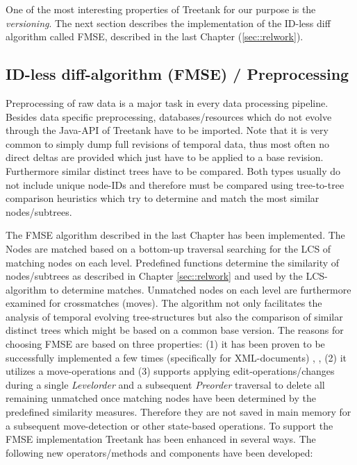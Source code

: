 One of the most interesting properties of Treetank for our purpose is the \emph{versioning}. The next section describes the implementation of the ID-less diff algorithm called FMSE, described in the last Chapter (\ref{sec::relwork}).

\subsection{ID-less diff-algorithm (FMSE) / Preprocessing}
Preprocessing of raw data is a major task in every data processing pipeline. Besides data specific preprocessing, databases/resources which do not evolve through the Java-API of Treetank have to be imported. Note that it is very common to simply dump full revisions of temporal data, thus most often no direct deltas are provided which just have to be applied to a base revision. Furthermore similar distinct trees have to be compared. Both types usually do not include unique node-IDs and therefore must be compared using tree-to-tree comparison heuristics which try to determine and match the most similar nodes/subtrees. %

The FMSE algorithm described in the last Chapter has been implemented. The Nodes are matched based on a bottom-up traversal searching for the LCS of matching nodes on each level. Predefined functions determine the similarity of nodes/subtrees as described in Chapter \ref{sec::relwork} and used by the LCS-algorithm to determine matches. Unmatched nodes on each level are furthermore examined for crossmatches (moves). The algorithm not only facilitates the analysis of temporal evolving tree-structures but also the comparison of similar distinct trees which might be based on a common base version. The reasons for choosing FMSE are based on three properties: (1) it has been proven to be successfully implemented a few times (specifically for XML-documents) \cite{xmldiff}, \cite{diffxml}, (2) it utilizes a move-operations and (3) supports applying edit-operations/changes during a single \emph{Levelorder} and a subsequent \emph{Preorder} traversal to delete all remaining unmatched once matching nodes have been determined by the predefined similarity measures. Therefore they are not saved in main memory for a subsequent move-detection or other state-based operations. To support the FMSE implementation Treetank has been enhanced in several ways. The following new operators/methods and components have been developed:

